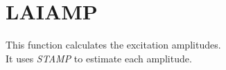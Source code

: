 \section{LAIAMP}
\label{sect:laiamp}

\noindent This function calculates the excitation amplitudes.\\

\noindent It uses {\em STAMP} to estimate each amplitude.\\
